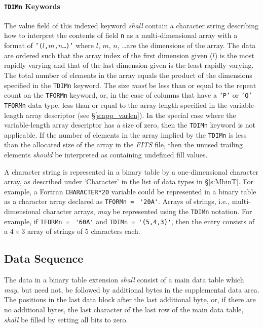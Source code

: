 \documentclass[11pt,makeidx]{book}     %
\begin{document}
   \paragraph{{\tt TDIMn} Keywords} \label{s:app_dim}
    The value field of this indexed keyword 
    {\em shall} contain a character string describing how to interpret
    the contents of field {\tt n} as a multi-dimensional array
    with a format of {\tt '($l$,$m$,$n$\ldots)'} where $l$, $m$, $n$,
    \ldots are the dimensions of the array. The data are ordered such 
    that the array index of the first dimension given ($l$) is the most
    rapidly varying and that of the last dimension given is the least 
    rapidly varying.  The total number of elements in the array equals
    the product of the dimensions specified in the {\tt TDIMn} keyword.
    The size {\em must} be less than or equal to the repeat count on the 
    {\tt TFORMn} keyword, or, in the case of columns that have a
    {\tt 'P'} or {\tt 'Q'} {\tt TFORMn} data type, less than or equal to the array length
    specified in the variable-length array descriptor 
    (see \S\ref{s:app_varlen}).  In the special case where the 
    variable-length array descriptor has a size of zero, then the
    {\tt TDIMn} keyword is not applicable.  If the number of elements
    in the array implied by the {\tt TDIMn} is less than the allocated
    size of the array in the {\em FITS\/} file, then the unused trailing
    elements {\em should} be interpreted as containing undefined fill values.

    A character string  is represented in a binary
table by a one-dimensional character array, as described under `Character'
in the list of data types in
\S\ref{s:MbinT}.  For example, a
Fortran {\tt CHARACTER*20}  variable could be represented in a
binary table as a character array declared as
{\tt TFORMn = } \verb*/'20A'/.  Arrays of strings, i.e.,
multi-dimensional character arrays, {\em may} be represented using the
{\tt TDIMn} notation.  For example, if {\tt TFORMn  = } \verb*/'60A'/
and \verb/TDIMn = '(5,4,3)'/, then the entry consists of a
$4\times 3$ array of strings of 5 characters each. 
    
   \subsection{Data Sequence}
   \label{s:btds}
   
   The data in a binary table extension {\em shall} consist of a 
   main data table which {\em may}, but need not, be followed by 
   additional bytes in the supplemental data area.  The positions in the last
   data block after the last additional byte, or, if there are no 
   additional bytes, the last character of the last row of the 
   main data table, {\em shall} be filled by setting all bits to zero.
\end{document}

